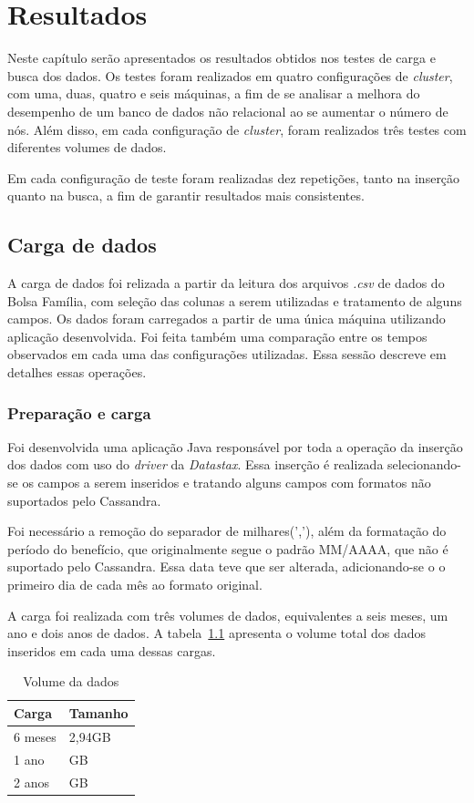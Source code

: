 \chapter{Resultados}

Neste capítulo serão apresentados os resultados obtidos nos testes de carga e busca dos dados. Os testes foram realizados em quatro configurações de \emph{cluster}, com uma, duas, quatro e seis máquinas, a fim de se analisar a melhora do desempenho de um banco de dados não relacional ao se aumentar o número de nós. Além disso, em cada configuração de \emph{cluster}, foram realizados três testes com diferentes volumes de dados. 

Em cada configuração de teste foram realizadas dez repetições, tanto na inserção quanto na busca, a fim de garantir resultados mais consistentes. 

\section{Carga de dados}
A carga de dados foi relizada a partir da leitura dos arquivos \emph{.csv} de dados do Bolsa Família, com seleção das colunas a serem utilizadas e tratamento de alguns campos.
Os dados foram carregados a partir de uma única máquina utilizando aplicação desenvolvida. Foi feita também uma comparação entre os tempos observados em cada uma das configurações utilizadas. Essa sessão descreve em detalhes essas operações.

\subsection{Preparação e carga}
Foi desenvolvida uma aplicação Java responsável por toda a operação da inserção dos dados com uso do \emph{driver} da \emph{Datastax}. Essa inserção é realizada selecionando-se os campos a serem inseridos e tratando alguns campos com formatos não suportados pelo Cassandra. 

Foi necessário a remoção do separador de milhares(','), além da formatação do período do benefício, que originalmente segue o padrão MM/AAAA, que não é suportado pelo Cassandra. Essa data teve que ser alterada, adicionando-se o o primeiro dia de cada mês ao formato original.

A carga foi realizada com três volumes de dados, equivalentes a seis meses, um ano e dois anos de dados. A tabela~\ref{tab:volume} apresenta o volume total dos dados inseridos em cada uma dessas cargas.

\begin{table}[]
	\centering
	\caption{Volume da dados}
	\label{tab:volume}
	\begin{tabular}{ll}
		\textbf{Carga} & \textbf{Tamanho} \\ \hline
		6 meses        &  2,94GB             \\ \hline
		1 ano          &  GB             \\ \hline
		2 anos         &  GB             \\ \hline
	\end{tabular}
\end{table}

